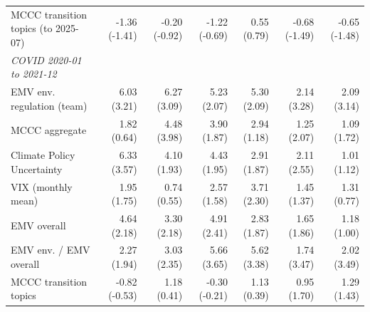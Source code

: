 \begin{table}[htbp]
\begin{tabular}{lrrrrrr}
MCCC transition topics (to 2025-07) & -1.36 (-1.41) & -0.20 (-0.92) & -1.22 (-0.69) & 0.55 (0.79) & -0.68 (-1.49) & -0.65 (-1.48) \\
\textit{COVID 2020-01 to 2021-12} &  &  &  &  &  &  \\
EMV env. regulation (team) & 6.03 (3.21) & 6.27 (3.09) & 5.23 (2.07) & 5.30 (2.09) & 2.14 (3.28) & 2.09 (3.14) \\
MCCC aggregate & 1.82 (0.64) & 4.48 (3.98) & 3.90 (1.87) & 2.94 (1.18) & 1.25 (2.07) & 1.09 (1.72) \\
Climate Policy Uncertainty & 6.33 (3.57) & 4.10 (1.93) & 4.43 (1.95) & 2.91 (1.87) & 2.11 (2.55) & 1.01 (1.12) \\
VIX (monthly mean) & 1.95 (1.75) & 0.74 (0.55) & 2.57 (1.58) & 3.71 (2.30) & 1.45 (1.37) & 1.31 (0.77) \\
EMV overall & 4.64 (2.18) & 3.30 (2.18) & 4.91 (2.41) & 2.83 (1.87) & 1.65 (1.86) & 1.18 (1.00) \\
EMV env. / EMV overall & 2.27 (1.94) & 3.03 (2.35) & 5.66 (3.65) & 5.62 (3.38) & 1.74 (3.47) & 2.02 (3.49) \\
MCCC transition topics & -0.82 (-0.53) & 1.18 (0.41) & -0.30 (-0.21) & 1.13 (0.39) & 0.95 (1.70) & 1.29 (1.43) \\
\bottomrule
\end{tabular}
\end{table}
